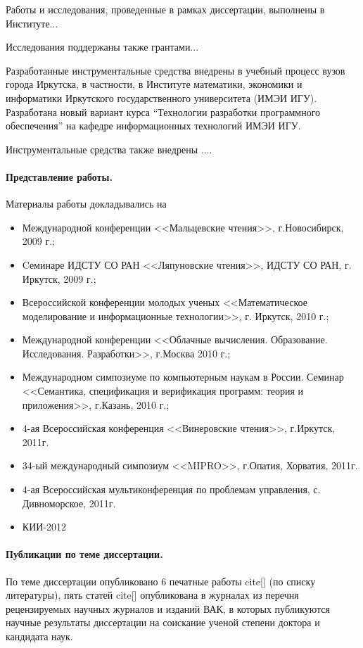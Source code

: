 Работы и исследования, проведенные в рамках  диссертации, выполнены в Институте... 

Исследования поддержаны также грантами... 

Разработанные инструментальные средства внедрены в учебный процесс вузов города Иркутска, в частности, в Институте математики, экономики и информатики Иркутского государственного университета (ИМЭИ ИГУ). Разработана новый вариант курса ``Технологии разработки программного обеспечения'' на кафедре информационных технологий ИМЭИ ИГУ.


Инструментальные средства также внедрены ....




\paragraph{Представление работы.} Материалы работы докладывались на 
\begin{itemize}
\item Международной конференции <<Мальцевские чтения>>, г.Новосибирск, 2009 г.;
\item Cеминаре ИДСТУ СО РАН <<Ляпуновские чтения>>, ИДСТУ СО РАН, г. Иркутск, 2009 г.;
\item Всероссийской конференции молодых ученых <<Математическое моделирование и информационные технологии>>, г. Иркутск, 2010 г.; 
\item Международной конференции <<Облачные вычисления. Образование. Исследования. Разработки>>, г.Москва 2010 г.;
\item Международном симпозиуме по компьютерным наукам в России. Семинар <<Семантика, спецификация и верификация программ: теория и приложения>>, г.Казань, 2010 г.;
\item 4-ая Всероссийская конференция <<Винеровские чтения>>, г.Иркутск, 2011г.
\item 34-ый международный симпозиум <<MIPRO>>, г.Опатия, Хорватия, 2011г.
\item 4-ая Всероссийская мультиконференция по проблемам управления, с. Дивноморское, 2011г.
\item КИИ-2012
\end{itemize}

\paragraph{Публикации по теме диссертации.} По теме диссертации опубликовано 6 печатные работы cite[] (по списку литературы), пять статей cite[] опубликована в журналах из перечня рецензируемых научных журналов и изданий ВАК, в которых публикуются научные результаты диссертации на соискание ученой степени доктора и кандидата наук.

